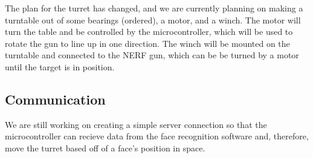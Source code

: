 \documentclass[journal]{IEEEtran}
\begin{document}
The plan for the turret has changed, and we are currently planning on making a turntable out of some bearings (ordered), a motor, and a winch. The motor will turn the table and be controlled by the microcontroller, which will be used to rotate the gun to line up in one direction. The winch will be mounted on the turntable and connected to the NERF gun, which can be be turned by a motor until the target is in position.

\subsection{Communication}

We are still working on creating a simple server connection so that the microcontroller can recieve data from the face recognition software and, therefore, move the turret based off of a face's position in space.


\nocite{*}



\end{document}
